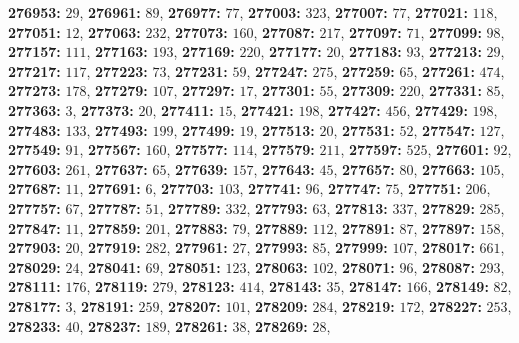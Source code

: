 \textsf{\bfseries 276953:} $29$, \textsf{\bfseries 276961:} $89$, \textsf{\bfseries 276977:} $77$, \textsf{\bfseries 277003:} $323$, \textsf{\bfseries 277007:} $77$, \textsf{\bfseries 277021:} $118$, \textsf{\bfseries 277051:} $12$, \textsf{\bfseries 277063:} $232$, \textsf{\bfseries 277073:} $160$, \textsf{\bfseries 277087:} $217$, \textsf{\bfseries 277097:} $71$, \textsf{\bfseries 277099:} $98$, \textsf{\bfseries 277157:} $111$, \textsf{\bfseries 277163:} $193$, \textsf{\bfseries 277169:} $220$, \textsf{\bfseries 277177:} $20$, \textsf{\bfseries 277183:} $93$, \textsf{\bfseries 277213:} $29$, \textsf{\bfseries 277217:} $117$, \textsf{\bfseries 277223:} $73$, \textsf{\bfseries 277231:} $59$, \textsf{\bfseries 277247:} $275$, \textsf{\bfseries 277259:} $65$, \textsf{\bfseries 277261:} $474$, \textsf{\bfseries 277273:} $178$, \textsf{\bfseries 277279:} $107$, \textsf{\bfseries 277297:} $17$, \textsf{\bfseries 277301:} $55$, \textsf{\bfseries 277309:} $220$, \textsf{\bfseries 277331:} $85$, \textsf{\bfseries 277363:} $3$, \textsf{\bfseries 277373:} $20$, \textsf{\bfseries 277411:} $15$, \textsf{\bfseries 277421:} $198$, \textsf{\bfseries 277427:} $456$, \textsf{\bfseries 277429:} $198$, \textsf{\bfseries 277483:} $133$, \textsf{\bfseries 277493:} $199$, \textsf{\bfseries 277499:} $19$, \textsf{\bfseries 277513:} $20$, \textsf{\bfseries 277531:} $52$, \textsf{\bfseries 277547:} $127$, \textsf{\bfseries 277549:} $91$, \textsf{\bfseries 277567:} $160$, \textsf{\bfseries 277577:} $114$, \textsf{\bfseries 277579:} $211$, \textsf{\bfseries 277597:} $525$, \textsf{\bfseries 277601:} $92$, \textsf{\bfseries 277603:} $261$, \textsf{\bfseries 277637:} $65$, \textsf{\bfseries 277639:} $157$, \textsf{\bfseries 277643:} $45$, \textsf{\bfseries 277657:} $80$, \textsf{\bfseries 277663:} $105$, \textsf{\bfseries 277687:} $11$, \textsf{\bfseries 277691:} $6$, \textsf{\bfseries 277703:} $103$, \textsf{\bfseries 277741:} $96$, \textsf{\bfseries 277747:} $75$, \textsf{\bfseries 277751:} $206$, \textsf{\bfseries 277757:} $67$, \textsf{\bfseries 277787:} $51$, \textsf{\bfseries 277789:} $332$, \textsf{\bfseries 277793:} $63$, \textsf{\bfseries 277813:} $337$, \textsf{\bfseries 277829:} $285$, \textsf{\bfseries 277847:} $11$, \textsf{\bfseries 277859:} $201$, \textsf{\bfseries 277883:} $79$, \textsf{\bfseries 277889:} $112$, \textsf{\bfseries 277891:} $87$, \textsf{\bfseries 277897:} $158$, \textsf{\bfseries 277903:} $20$, \textsf{\bfseries 277919:} $282$, \textsf{\bfseries 277961:} $27$, \textsf{\bfseries 277993:} $85$, \textsf{\bfseries 277999:} $107$, \textsf{\bfseries 278017:} $661$, \textsf{\bfseries 278029:} $24$, \textsf{\bfseries 278041:} $69$, \textsf{\bfseries 278051:} $123$, \textsf{\bfseries 278063:} $102$, \textsf{\bfseries 278071:} $96$, \textsf{\bfseries 278087:} $293$, \textsf{\bfseries 278111:} $176$, \textsf{\bfseries 278119:} $279$, \textsf{\bfseries 278123:} $414$, \textsf{\bfseries 278143:} $35$, \textsf{\bfseries 278147:} $166$, \textsf{\bfseries 278149:} $82$, \textsf{\bfseries 278177:} $3$, \textsf{\bfseries 278191:} $259$, \textsf{\bfseries 278207:} $101$, \textsf{\bfseries 278209:} $284$, \textsf{\bfseries 278219:} $172$, \textsf{\bfseries 278227:} $253$, \textsf{\bfseries 278233:} $40$, \textsf{\bfseries 278237:} $189$, \textsf{\bfseries 278261:} $38$, \textsf{\bfseries 278269:} $28$, 
